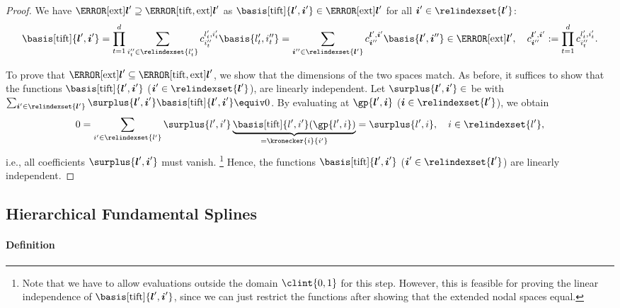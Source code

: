 \begin{proof}
  We have $\ns[\ext]{\*l'} \supset \ns[\tift,\ext]{\*l'}$ as
  $\basis[\tift]{\*l',\*i'} \in \ns[\ext]{\*l'}$
  for all $\*i' \in \relindexset{\*l'}$:
  \begin{equation}
    \basis[\tift]{\*l',\*i'}
    = \prod_{t=1}^d \sum_{i''_t \in \relindexset{l'_t}}
    c_{i''_t}^{l'_t,i'_t} \basis{l'_t,i''_t}
    = \sum_{\*i'' \in \relindexset{\*l'}}
    c_{\*i''}^{\*l',\*i'} \basis{\*l',\*i''}
    \in \ns[\ext]{\*l'},\quad
    c_{\*i''}^{\*l',\*i'}
    := \prod_{t=1}^d c_{i''_t}^{l'_t,i'_t}.
  \end{equation}
  
  To prove that
  $\ns[\ext]{\*l'} \subset \ns[\tift,\ext]{\*l'}$,
  we show that the dimensions of the two spaces match.
  As before, it suffices to show that
  the functions $\basis[\tift]{\*l',\*i'}$ ($\*i' \in \relindexset{\*l'}$),
  are linearly independent.
  Let $\surplus{\*l',\*i'} \in \real$ be with
  $\sum_{\*i' \in \relindexset{\*l'}}
  \surplus{\*l',\*i'} \basis[\tift]{\*l',\*i'} \equiv 0$.
  By evaluating at $\gp{\*l',\*i}$ ($\*i \in \relindexset{\*l'}$), we obtain
  \begin{equation}
    0
    = \sum_{\*i' \in \relindexset{\*l'}} \surplus{\*l',\*i'}
    \underbrace{\basis[\tift]{\*l',\*i'}(\gp{\*l',\*i})}_{=\kronecker{\*i}{\*i'}}
    = \surplus{\*l',\*i},\quad
    \*i \in \relindexset{\*l'},
  \end{equation}
  i.e., all coefficients $\surplus{\*l',\*i'}$ must vanish.%
  \footnote{%
    Note that we have to allow evaluations outside the
    domain $\clint{0, 1}$ for this step.
    However, this is feasible for proving the linear independence
    of $\basis[\tift]{\*l',\*i'}$, since we can just restrict the functions
    after showing that the extended nodal spaces equal.%
  }
  Hence, the functions $\basis[\tift]{\*l',\*i'}$ ($\*i' \in \relindexset{\*l'}$)
  are linearly independent.
\end{proof}



\subsection{Hierarchical Fundamental Splines}
\label{sec:443fundamentalSplines}

\paragraph{Definition}

